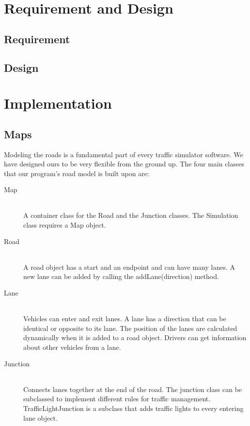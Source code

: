 \documentclass[11pt]{article}
\begin{document}
\section{Requirement and Design}
	\subsection{Requirement}
	\subsection{Design}
	
\newpage
\section{Implementation}

\subsection{Maps}

Modeling the roads is a fundamental part of every traffic simulator software. We have designed ours to be very flexible from the ground up. The four main classes that our program's road model is built upon are:

\begin{description}
  \item[Map] \hfill \\
  A container class for the Road and the Junction classes. The Simulation class requires a Map object.
  \item[Road] \hfill \\
  A road object has a start and an endpoint and can have many lanes. A new lane can be added by calling the addLane(direction) method.
  \item[Lane] \hfill \\
  Vehicles can enter and exit lanes. A lane has a direction that can be identical or opposite to its lane. The position of the lanes are calculated dynamically when it is added to a road object. Drivers can get information about other vehicles from a lane.
  \item[Junction] \hfill \\
  Connects lanes together at the end of the road. The junction class can be subclassed to implement different rules for traffic management. TrafficLightJunction is a subclass that adds traffic lights to every entering lane object.
\end{description}
\end{document}
